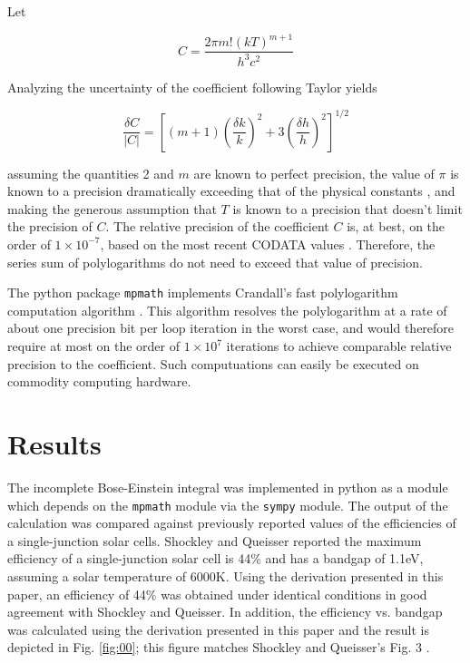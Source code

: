 \documentclass[letterpaper,12pt]{article}
\begin{document}
Let

\begin{equation} \label{eq:52}
C = \frac{2 \pi m! (kT)^{m+1}}{h^{3}c^{2}}
\end{equation}

\noindent Analyzing the uncertainty of the coefficient following Taylor \cite{9780935702422} yields

\begin{equation} \label{eq:53}
\frac{\delta C}{|C|} = \left[ (m+1) \left( \frac{\delta k}{k} \right)^{2} + 3 \left( \frac{\delta h}{h} \right)^{2} \right]^{1/2}
\end{equation}

\noindent assuming the quantities 2 and $m$ are known to perfect precision, the value of $\pi$ is known to a precision dramatically exceeding that of the physical constants \cite{http://www.numberworld.org/misc_runs/pi-12t}, and making the generous assumption that $T$ is known to a precision that doesn't limit the precision of $C$. The relative precision of the coefficient $C$ is, at best, on the order of $1 \times 10^{-7}$, based on the most recent CODATA values \cite{10.1103/RevModPhys.84.1527}. Therefore, the series sum of polylogarithms do not need to exceed that value of precision.

The python package \texttt{mpmath} \cite{mpmath} implements Crandall's fast polylogarithm computation algorithm \cite{http://academic.reed.edu/physics/faculty/crandall/papers/Polylog}. This algorithm resolves the polylogarithm at a rate of about one precision bit per loop iteration in the worst case, and would therefore require at most on the order of $1 \times 10^{7}$ iterations to achieve comparable relative precision to the coefficient. Such computuations can easily be executed on commodity computing hardware.


\section{Results}
The incomplete Bose-Einstein integral was implemented in python as a module \cite{10.6084/m9.figshare.1229713} which depends on the \texttt{mpmath} module via the \texttt{sympy} module. The output of the calculation was compared against previously reported values of the efficiencies of a single-junction solar cells. Shockley and Queisser \cite{10.1063/1.1736034} reported the maximum efficiency of a single-junction solar cell is 44\% and has a bandgap of 1.1eV, assuming a solar temperature of 6000K. Using the derivation presented in this paper, an efficiency of 44\% was obtained under identical conditions in good agreement with Shockley and Queisser. In addition, the efficiency vs. bandgap was calculated using the derivation presented in this paper and the result is depicted in Fig. \ref{fig:00}; this figure matches Shockley and Queisser's Fig. 3 \cite{10.1063/1.1736034}.
\end{document}

